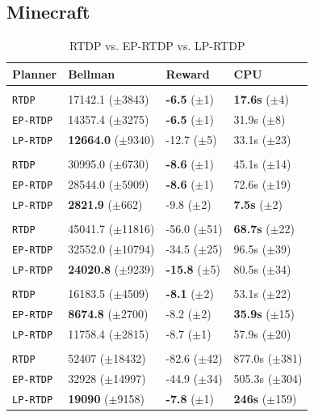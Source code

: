 \documentclass[letterpaper]{article}
\newcommand{\ra}[1]{\renewcommand{\arraystretch}{#1}} %
\begin{document}
\subsection{Minecraft}

\begin{table}
\ra{1.15}
\small
\begin{tabular}{@{}llll@{}}\toprule
Planner & Bellman & Reward & CPU \\ \midrule
&\hspace{-10mm}{\it Mining Task} \\
\texttt{RTDP} & 17142.1 ($\pm$3843) 		& {\bf -6.5} ($\pm$1)  & {\bf 17.6s}   ($\pm$4) \\
\texttt{EP-RTDP} 	& 14357.4 ($\pm$3275) 		& {\bf -6.5}   ($\pm$1) & 31.9s   ($\pm$8) \\
\texttt{LP-RTDP} 	& {\bf 12664.0} ($\pm$9340) 	& -12.7 ($\pm$5) & 33.1s   ($\pm$23) \\\hline
&\hspace{-10mm}{\it Smelting Task} \\
\texttt{RTDP} 	& 30995.0 ($\pm$6730) 		& {\bf -8.6}   ($\pm$1) & 45.1s   ($\pm$14) \\
\texttt{EP-RTDP} 	& 28544.0 ($\pm$5909) 		& {\bf -8.6}   ($\pm$1) & 72.6s   ($\pm$19) \\ 
\texttt{LP-RTDP} 	& {\bf 2821.9} 	 ($\pm$662) 	& -9.8   ($\pm$2) & {\bf 7.5s}  ($\pm$2) \\ \hline
&\hspace{-10mm}{\it Wall Traversal Task} \\
\texttt{RTDP} & 45041.7 ($\pm$11816) 		& -56.0   ($\pm$51) & {\bf 68.7s}   ($\pm$22) \\
\texttt{EP-RTDP} 	& 32552.0 ($\pm$10794) 		& -34.5   ($\pm$25) & 96.5s   ($\pm$39) \\ 
\texttt{LP-RTDP} 	& {\bf 24020.8} ($\pm$9239) 	& {\bf -15.8}   ($\pm$5) & 80.5s   ($\pm$34) \\ \hline
&\hspace{-10mm}{\it Trench Traversal Task} \\
\texttt{RTDP}  	& 16183.5 ($\pm$4509) 		& {\bf -8.1}   ($\pm$2) & 53.1s   ($\pm$22) \\
\texttt{EP-RTDP} 	& {\bf 8674.8} 	($\pm$2700) 	& -8.2   ($\pm$2) & {\bf 35.9s}   ($\pm$15) \\ 
\texttt{LP-RTDP} 	& 11758.4 ($\pm$2815) 		& -8.7   ($\pm$1) & 57.9s   ($\pm$20) \\ \hline
&\hspace{-10mm}{\it Plane Traversal Task} \\
\texttt{RTDP} & 52407 ($\pm$18432) 		& -82.6   ($\pm$42) & 877.0s   ($\pm$381) \\
\texttt{EP-RTDP} 	& 32928 ($\pm$14997) 		& -44.9   ($\pm$34) & 505.3s   ($\pm$304) \\
\texttt{LP-RTDP} 	& {\bf 19090} 	 ($\pm$9158) 	& {\bf-7.8}   ($\pm$1) & {\bf 246s}  ($\pm$159) \\
\bottomrule
\end{tabular}
\caption{RTDP vs. EP-RTDP vs. LP-RTDP}
\label{table:minecraft_results}
\end{table}
\end{document}
